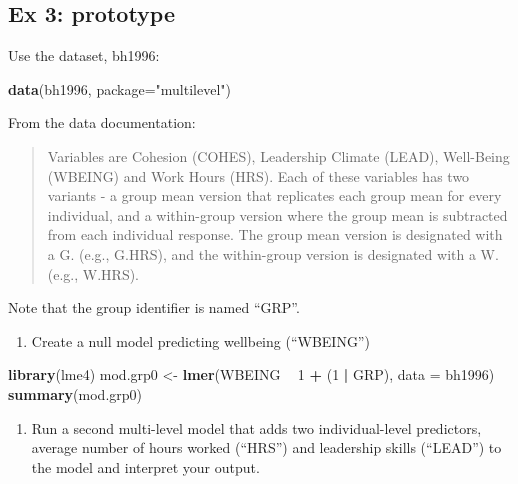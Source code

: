 \documentclass[]{book}
\newenvironment{Shaded}{\begin{snugshade}}{\end{snugshade}}
\newcommand{\KeywordTok}[1]{\textcolor[rgb]{0.13,0.29,0.53}{\textbf{#1}}}
\newcommand{\DataTypeTok}[1]{\textcolor[rgb]{0.13,0.29,0.53}{#1}}
\newcommand{\DecValTok}[1]{\textcolor[rgb]{0.00,0.00,0.81}{#1}}
\newcommand{\StringTok}[1]{\textcolor[rgb]{0.31,0.60,0.02}{#1}}
\newcommand{\OperatorTok}[1]{\textcolor[rgb]{0.81,0.36,0.00}{\textbf{#1}}}
\newcommand{\NormalTok}[1]{#1}
\providecommand{\tightlist}{%
  \setlength{\itemsep}{0pt}\setlength{\parskip}{0pt}}
\begin{document}
\subsection{Ex 3: prototype}\label{ex-3-prototype-1}

Use the dataset, bh1996:

\begin{Shaded}
\begin{Highlighting}[]
  \KeywordTok{data}\NormalTok{(bh1996, }\DataTypeTok{package=}\StringTok{"multilevel"}\NormalTok{)}
\end{Highlighting}
\end{Shaded}

From the data documentation:

\begin{quote}
Variables are Cohesion (COHES), Leadership Climate (LEAD), Well-Being
(WBEING) and Work Hours (HRS). Each of these variables has two variants
- a group mean version that replicates each group mean for every
individual, and a within-group version where the group mean is
subtracted from each individual response. The group mean version is
designated with a G. (e.g., G.HRS), and the within-group version is
designated with a W. (e.g., W.HRS).
\end{quote}

Note that the group identifier is named ``GRP''.

\begin{enumerate}
\def\labelenumi{\arabic{enumi}.}
\tightlist
\item
  Create a null model predicting wellbeing (``WBEING'')
\end{enumerate}

\begin{Shaded}
\begin{Highlighting}[]
  \KeywordTok{library}\NormalTok{(lme4)}
\NormalTok{  mod.grp0 <-}\StringTok{ }\KeywordTok{lmer}\NormalTok{(WBEING }\OperatorTok{~}\StringTok{ }\DecValTok{1} \OperatorTok{+}\StringTok{ }\NormalTok{(}\DecValTok{1} \OperatorTok{|}\StringTok{ }\NormalTok{GRP), }\DataTypeTok{data =}\NormalTok{ bh1996)}
  \KeywordTok{summary}\NormalTok{(mod.grp0)}
\end{Highlighting}
\end{Shaded}

\begin{enumerate}
\def\labelenumi{\arabic{enumi}.}
\setcounter{enumi}{2}
\tightlist
\item
  Run a second multi-level model that adds two individual-level
  predictors, average number of hours worked (``HRS'') and leadership
  skills (``LEAD'') to the model and interpret your output.
\end{enumerate}
\end{document}
